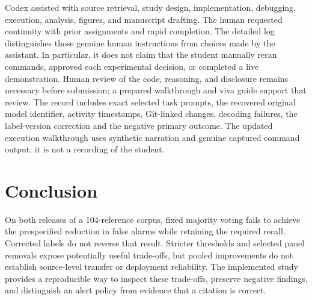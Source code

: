 \documentclass[acmsmall,screen,nonacm]{acmart}
\begin{document}
Codex assisted with source retrieval, study design, implementation, debugging, execution, analysis, figures, and manuscript drafting. The human requested continuity with prior assignments and rapid completion. The detailed log distinguishes those genuine human instructions from choices made by the assistant. In particular, it does not claim that the student manually reran commands, approved each experimental decision, or completed a live demonstration. Human review of the code, reasoning, and disclosure remains necessary before submission; a prepared walkthrough and viva guide support that review. The record includes exact selected task prompts, the recovered original model identifier, activity timestamps, Git-linked changes, decoding failures, the label-version correction and the negative primary outcome. The updated execution walkthrough uses synthetic narration and genuine captured command output; it is not a recording of the student.

\section{Conclusion}
On both releases of a 104-reference corpus, fixed majority voting fails to achieve the prespecified reduction in false alarms while retaining the required recall. Corrected labels do not reverse that result. Stricter thresholds and selected panel removals expose potentially useful trade-offs, but pooled improvements do not establish source-level transfer or deployment reliability. The implemented study provides a reproducible way to inspect these trade-offs, preserve negative findings, and distinguish an alert policy from evidence that a citation is correct.



\end{document}
